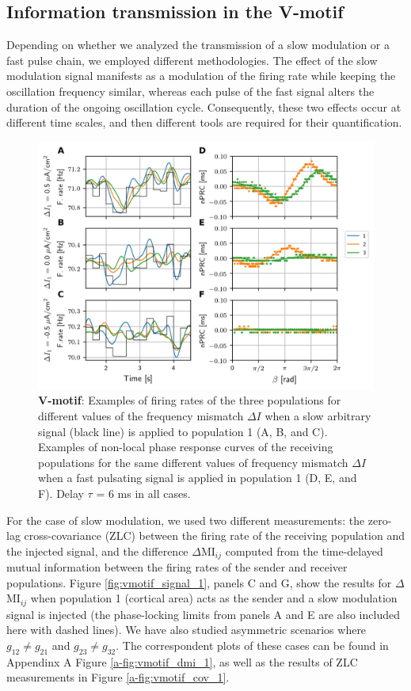\documentclass[../main.tex]{subfiles}
\begin{document}
\subsection{Information transmission in the V-motif}
Depending on whether we analyzed the transmission of a slow modulation or a fast pulse chain, we employed different methodologies.
The effect of the slow modulation signal manifests as a modulation of the firing rate while keeping the oscillation frequency similar, whereas each pulse of the fast signal alters the duration of the ongoing oscillation cycle.
Consequently, these two effects occur at different time scales, and then different tools are required for their quantification.

\begin{figure}[!htb]
 \centering
    \includegraphics[width=\textwidth]{chapter2/figures/fig3}
    \caption{\textbf{V-motif}: Examples of firing rates of the three populations for different values of the frequency mismatch $\Delta I$ when a slow arbitrary signal (black line) is applied to population 1 (A, B, and C).
    Examples of non-local phase response curves of the receiving populations for the same different values of frequency mismatch $\Delta I$ when a fast pulsating signal is applied in population 1 (D, E, and F).
    Delay $\tau$ = 6 ms in all cases.}
    \label{fig:vmotif_series_1}
\end{figure}
For the case of slow modulation, we used two different measurements: the zero-lag cross-covariance (ZLC) between the firing rate of the receiving population and the injected signal, and the difference $\Delta$MI$_{ij}$ computed from the time-delayed mutual information between the firing rates of the sender and receiver populations.
Figure \ref{fig:vmotif_signal_1}, panels C and G, show the results for $\Delta$MI$_{ij}$ when population 1 (cortical area) acts as the sender and a slow modulation signal is injected (the phase-locking limits from panels A and E are also included here with dashed lines). 
We have also studied asymmetric scenarios where $g_{12}\neq g_{21}$ and $g_{23} \neq g_{32}$.
The correspondent plots of these cases can be found in Appendinx A Figure \ref{a-fig:vmotif_dmi_1}, as well as the results of ZLC measurements in Figure \ref{a-fig:vmotif_cov_1}.
\end{document}
